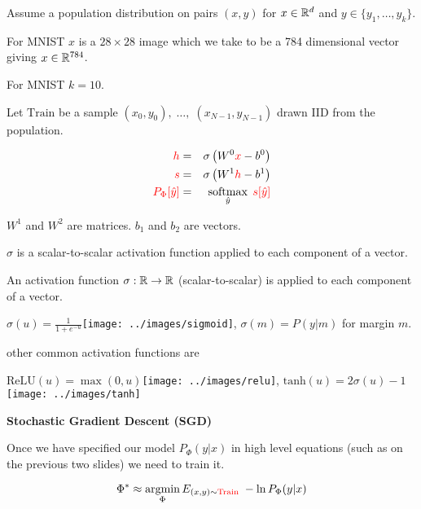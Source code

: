 {

Assume a population distribution on pairs $(x,y)$ for $x \in \mathbb{R}^d$ and $y \in \{y_1,\ldots, y_k\}$.

\vfill
For MNIST $x$ is a $28 \times 28$ image which we take to be a 784 dimensional vector giving $x \in \mathbb{R}^{784}$.

\vfill
For MNIST $k = 10$.

\vfill
Let $\mathrm{Train}$ be a sample $(x_0,y_0),\;\ldots,\;(x_{N-1},y_{N-1})$ drawn IID from the population.

\begin{eqnarray*}
  {\color{red} h} & = & \sigma\left(W^0{\color{red} x} - b^0\right) \\
  {\color{red} s} & = & \sigma\left(W^1{\color{red} h} - b^1 \right) \\
  {\color{red} P_\Phi[\hat{y}]} & = & \operatorname*{softmax}_{\hat{y}}\;{\color{red} s[\hat{y}]}
\end{eqnarray*}

\vfill
$W^1$ and $W^2$ are matrices. $b_1$ and $b_2$ are vectors.

\vfill
$\sigma$ is a scalar-to-scalar activation function applied to each component of a vector.


An activation function $\sigma:\mathbb{R} \rightarrow \mathbb{R}$ (scalar-to-scalar) is applied to each component of a vector.

\vfill
\centerline{{\color{red} $\sigma(u) = \frac{1}{1+e^{-u}}$}\hspace{3em}\texttt{[image: ../images/sigmoid]}, {\color{red} $\sigma(m) = P(y|m)$ for margin $m$}.}

\vfill
other common activation functions are

\vfill
\centerline{{\color{red} $\mathrm{ReLU}(u) = \max(0,u)$}\texttt{[image: ../images/relu]},
{\color{red} $\mathrm{tanh}(u) = 2\sigma(u)-1$}\texttt{[image: ../images/tanh]}}

\slide{}

\centerline{\bf Stochastic Gradient Descent (SGD)}

\slide{}

Once we have specified our model $P_\Phi(y|x)$ in high level equations (such as on the previous two slides) we need to train it.

$$\Phi^* \approx \operatorname*{argmin}_\Phi E_{(x,y) \sim {\color{red} \mathrm{Train}}} \; - \ln P_\Phi(y|x)$$

}
